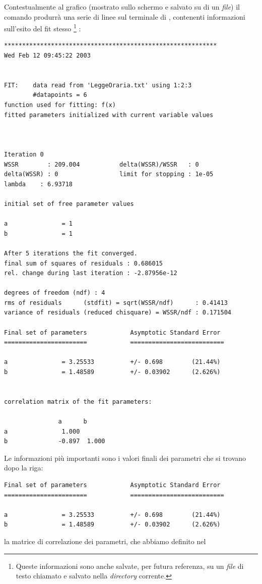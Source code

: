 Contestualmente al grafico (mostrato sullo schermo e salvato su di un
\emph{file}) il comando  produrr\`a una serie di linee sul
terminale di \gnuplot, contenenti informazioni sull'esito del fit stesso%
\footnote{
Queste informazioni sono anche salvate, per futura referenza, su un
\emph{file} di testo chiamato  e salvato nella \emph{directory}
corrente.
}%
:
\begin{verbatim}
***********************************************************
Wed Feb 12 09:45:22 2003


FIT:    data read from 'LeggeOraria.txt' using 1:2:3
        #datapoints = 6
function used for fitting: f(x)
fitted parameters initialized with current variable values



Iteration 0
WSSR        : 209.004           delta(WSSR)/WSSR   : 0
delta(WSSR) : 0                 limit for stopping : 1e-05
lambda    : 6.93718

initial set of free parameter values

a               = 1
b               = 1

After 5 iterations the fit converged.
final sum of squares of residuals : 0.686015
rel. change during last iteration : -2.87956e-12

degrees of freedom (ndf) : 4
rms of residuals      (stdfit) = sqrt(WSSR/ndf)      : 0.41413
variance of residuals (reduced chisquare) = WSSR/ndf : 0.171504

Final set of parameters            Asymptotic Standard Error
=======================            ==========================

a               = 3.25533          +/- 0.698        (21.44%)
b               = 1.48589          +/- 0.03902      (2.626%)


correlation matrix of the fit parameters:

               a      b
a               1.000
b              -0.897  1.000
\end{verbatim}
Le informazioni pi\`u importanti sono i valori finali dei parametri che
si trovano dopo la riga:
\begin{verbatim}
Final set of parameters            Asymptotic Standard Error
=======================            ==========================

a               = 3.25533          +/- 0.698        (21.44%)
b               = 1.48589          +/- 0.03902      (2.626%)
\end{verbatim}
la matrice di correlazione dei parametri, che abbiamo definito nel
